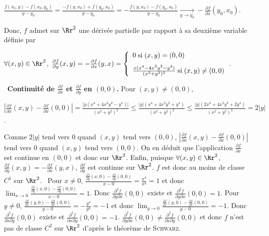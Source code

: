 {{\begin{center}
$\frac{f(x_0,y)-f(x_0,y_0)}{y-y_0}=\frac{-f(y,x_0)+f(y_0,x_0)}{y-y_0}=-\frac{f(y,x_0)-f(y_0,x_0)}{y-y_0}\underset{y\rightarrow y_0}{\rightarrow}-\frac{\partial f}{\partial x}(y_0,x_0)$.
\end{center}
Donc, $f$ admet sur $\Rr^2$ une dérivée partielle par rapport à sa deuxième variable définie par 

\begin{center}
$\forall(x,y)\in\Rr^2$, $\frac{\partial f}{\partial y}(x,y)=-\frac{\partial f}{\partial x}(y,x)=\left\{
\begin{array}{l}
\rule[-4mm]{0mm}{0mm}0\;\text{si}\;(x,y)=(0,0)\\
\frac{x(x^4-4x^2y^2-y^4)}{(x^2+y^2)^2}\;\text{si}\;(x,y)\neq(0,0)
\end{array}
\right.$.
\end{center}
\textbullet~\textbf{Continuité de $\frac{\partial f}{\partial x}$ et $\frac{\partial f}{\partial y}$ en $(0,0)$.} Pour $(x,y)\neq(0,0)$,

\begin{center}
$\left|\frac{\partial f}{\partial x}(x,y)-\frac{\partial f}{\partial x}(0,0)\right|=\frac{|y(x^4+4x^2y^2-y^4)|}{(x^2+y^2)^2}\leqslant\frac{|y|(x^4+4x^2y^2+y^4)}{(x^2+y^2)^2}\leqslant\frac{|y|(2x^4+4x^2y^2+2y^4)}{(x^2+y^2)^2}=2|y|$.
\end{center}
Comme $2|y|$ tend vers $0$ quand $(x,y)$ tend vers $(0,0)$, $\left|\frac{\partial f}{\partial x}(x,y)-\frac{\partial f}{\partial x}(0,0)\right|$ tend vers $0$ quand $(x,y)$ tend vers $(0,0)$. On en déduit que l'application $\frac{\partial f}{\partial x}$ est continue en $(0,0)$ et donc sur $\Rr^2$.
Enfin, puisque $\forall(x,y)\in\Rr^2$, $\frac{\partial f}{\partial y}(x,y)=-\frac{\partial f}{\partial x}(y,x)$, $\frac{\partial f}{\partial y}$ est continue sur $\Rr^2$. $f$ est donc au moins de classe $C^1$ sur $\Rr^2$.
\textbullet~Pour $x\neq0$, $\frac{\frac{\partial f}{\partial y}(x,0)-\frac{\partial f}{\partial y}(0,0)}{x-0}=\frac{x^4}{x^4}=1$ et donc $\lim_{x\rightarrow 0}\frac{\frac{\partial f}{\partial y}(x,0)-\frac{\partial f}{\partial y}(0,0)}{x-0}=1$. Donc $\frac{\partial^2f}{\partial y\partial x}(0,0)$ existe et $\frac{\partial^2f}{\partial y\partial x}(0,0)=1$.
Pour $y\neq0$, $\frac{\frac{\partial f}{\partial x}(y,0)-\frac{\partial f}{\partial x}(0,0)}{y-0}=-\frac{y^4}{y^4}=-1$ et donc $\lim_{y\rightarrow 0}\frac{\frac{\partial f}{\partial x}(y,0)-\frac{\partial f}{\partial x}(0,0)}{y-0}=-1$. Donc $\frac{\partial^2f}{\partial x\partial y}(0,0)$ existe et $\frac{\partial^2f}{\partial x\partial y}(0,0)=-1$.
$\frac{\partial^2f}{\partial y\partial x}(0,0)\neq\frac{\partial^2f}{\partial x\partial y}(0,0)$ et donc $f$ n'est pas de classe $C^2$ sur $\Rr^2$ d'après le théorème de \textsc{Schwarz}.

\begin{center}
\end{center}}
}